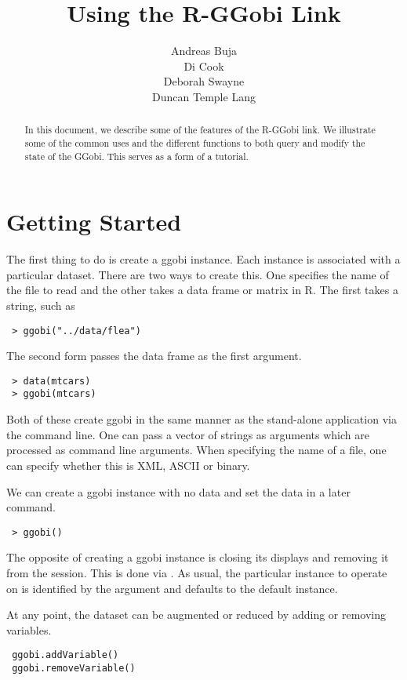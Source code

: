\documentclass{article}
\title{Using the R-GGobi Link}
\author{Andreas Buja \\
Di Cook \\
Deborah Swayne \\
Duncan Temple Lang}
\begin{document}
\begin{abstract}
  In this document, we describe some of the features of the R-GGobi
  link. We illustrate some of the common uses and the different
  functions to both query and modify the state of the GGobi.  This
  serves as a form of a tutorial.
\end{abstract}

\maketitle{}


\section{Getting Started}
The first thing to do is create a ggobi instance.
Each instance is associated with a particular dataset.
There are two ways to create this.
One specifies the name of the file to read
and the other takes a data frame or matrix in R.
The first takes a string, such as
\begin{verbatim}
 > ggobi("../data/flea")
\end{verbatim}
The second form passes the data frame as the first argument.
\begin{verbatim}
 > data(mtcars)
 > ggobi(mtcars)
\end{verbatim}
Both of these create ggobi in the same manner as the stand-alone
application via the command line.  One can pass a vector of strings as
arguments which are processed as command line arguments.  When
specifying the name of a file, one can specify whether this is XML,
ASCII or binary.

We can create a ggobi instance with no data and set the data in a
later command.
\begin{verbatim}
 > ggobi()
\end{verbatim}


The opposite of creating a ggobi instance is closing its displays and
removing it from the session.  This is done via
.  As usual, the particular instance to operate
on is identified by the  argument and defaults to the
default instance.



At any point, the dataset can be augmented or reduced by
adding or removing variables.
\begin{verbatim}
 ggobi.addVariable()
 ggobi.removeVariable()
\end{verbatim}
\end{document}
